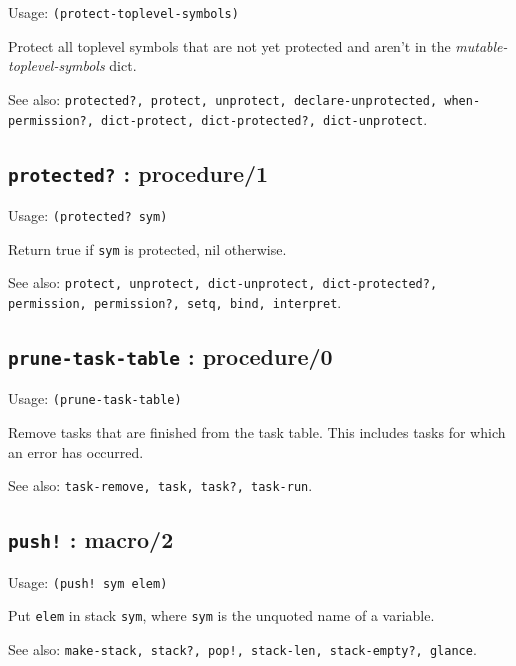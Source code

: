 \documentclass[
]{article}
\newcommand{\passthrough}[1]{#1}
\begin{document}
Usage: \passthrough{\lstinline!(protect-toplevel-symbols)!}

Protect all toplevel symbols that are not yet protected and aren't in
the \emph{mutable-toplevel-symbols} dict.

See also:
\passthrough{\lstinline!protected?, protect, unprotect, declare-unprotected, when-permission?, dict-protect, dict-protected?, dict-unprotect!}.

\hypertarget{protected-procedure1-1}{%
\subsection{\texorpdfstring{\texttt{protected?} :
procedure/1}{protected? : procedure/1}}\label{protected-procedure1-1}}

Usage: \passthrough{\lstinline!(protected? sym)!}

Return true if \passthrough{\lstinline!sym!} is protected, nil
otherwise.

See also:
\passthrough{\lstinline!protect, unprotect, dict-unprotect, dict-protected?, permission, permission?, setq, bind, interpret!}.

\hypertarget{prune-task-table-procedure0-1}{%
\subsection{\texorpdfstring{\texttt{prune-task-table} :
procedure/0}{prune-task-table : procedure/0}}\label{prune-task-table-procedure0-1}}

Usage: \passthrough{\lstinline!(prune-task-table)!}

Remove tasks that are finished from the task table. This includes tasks
for which an error has occurred.

See also: \passthrough{\lstinline!task-remove, task, task?, task-run!}.

\hypertarget{push-macro2-1}{%
\subsection{\texorpdfstring{\texttt{push!} :
macro/2}{push! : macro/2}}\label{push-macro2-1}}

Usage: \passthrough{\lstinline"(push! sym elem)"}

Put \passthrough{\lstinline!elem!} in stack
\passthrough{\lstinline!sym!}, where \passthrough{\lstinline!sym!} is
the unquoted name of a variable.

See also:
\passthrough{\lstinline"make-stack, stack?, pop!, stack-len, stack-empty?, glance"}.
\end{document}

